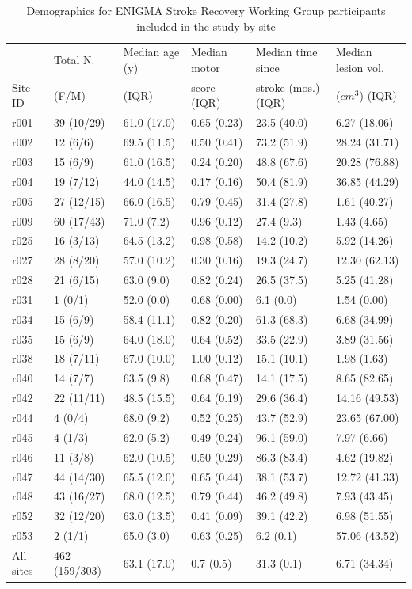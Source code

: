 \documentclass[10pt]{article}
\begin{document}
\begin{table}[h]
\centering
\label{table:5}
\caption{Demographics for ENIGMA Stroke Recovery Working Group participants included in the study by site}
\begin{tabular}{llllll}
\toprule
 & Total N. & Median age (y) & Median motor  & Median time since   & Median lesion vol. \\
Site ID & (F/M) & (IQR) & score (IQR) &  stroke (mos.) (IQR) & ($cm^3$) (IQR) \\
\midrule
r001 & 39 (10/29) & 61.0 (17.0) & 0.65 (0.23) & 23.5 (40.0) & 6.27 (18.06) \\
r002 & 12 (6/6) & 69.5 (11.5) & 0.50 (0.41) & 73.2 (51.9) & 28.24 (31.71) \\
r003 & 15 (6/9) & 61.0 (16.5) & 0.24 (0.20) & 48.8 (67.6) & 20.28 (76.88) \\
r004 & 19 (7/12) & 44.0 (14.5) & 0.17 (0.16) & 50.4 (81.9) & 36.85 (44.29) \\
r005 & 27 (12/15) & 66.0 (16.5) & 0.79 (0.45) & 31.4 (27.8) & 1.61 (40.27) \\
r009 & 60 (17/43) & 71.0 (7.2) & 0.96 (0.12) & 27.4 (9.3) & 1.43 (4.65) \\
r025 & 16 (3/13) & 64.5 (13.2) & 0.98 (0.58) & 14.2 (10.2) & 5.92 (14.26) \\
r027 & 28 (8/20) & 57.0 (10.2) & 0.30 (0.16) & 19.3 (24.7) & 12.30 (62.13) \\
r028 & 21 (6/15) & 63.0 (9.0) & 0.82 (0.24) & 26.5 (37.5) & 5.25 (41.28) \\
r031 & 1 (0/1) & 52.0 (0.0) & 0.68 (0.00) & 6.1 (0.0) & 1.54 (0.00) \\
r034 & 15 (6/9) & 58.4 (11.1) & 0.82 (0.20) & 61.3 (68.3) & 6.68 (34.99) \\
r035 & 15 (6/9) & 64.0 (18.0) & 0.64 (0.52) & 33.5 (22.9) & 3.89 (31.56) \\
r038 & 18 (7/11) & 67.0 (10.0) & 1.00 (0.12) & 15.1 (10.1) & 1.98 (1.63) \\
r040 & 14 (7/7) & 63.5 (9.8) & 0.68 (0.47) & 14.1 (17.5) & 8.65 (82.65) \\
r042 & 22 (11/11) & 48.5 (15.5) & 0.64 (0.19) & 29.6 (36.4) & 14.16 (49.53) \\
r044 & 4 (0/4) & 68.0 (9.2) & 0.52 (0.25) & 43.7 (52.9) & 23.65 (67.00) \\
r045 & 4 (1/3) & 62.0 (5.2) & 0.49 (0.24) & 96.1 (59.0) & 7.97 (6.66) \\
r046 & 11 (3/8) & 62.0 (10.5) & 0.50 (0.29) & 86.3 (83.4) & 4.62 (19.82) \\
r047 & 44 (14/30) & 65.5 (12.0) & 0.65 (0.44) & 38.1 (53.7) & 12.72 (41.33) \\
r048 & 43 (16/27) & 68.0 (12.5) & 0.79 (0.44) & 46.2 (49.8) & 7.93 (43.45) \\
r052 & 32 (12/20) & 63.0 (13.5) & 0.41 (0.09) & 39.1 (42.2) & 6.98 (51.55) \\
r053 & 2 (1/1) & 65.0 (3.0) & 0.63 (0.25) & 6.2 (0.1) & 57.06 (43.52) \\
\arrayrulecolor{black!30}\midrule
All sites & 462 (159/303) & 63.1 (17.0) & 0.7 (0.5) & 31.3 (0.1) & 6.71 (34.34) \\


\end{tabular}
\end{table}
\end{document}
